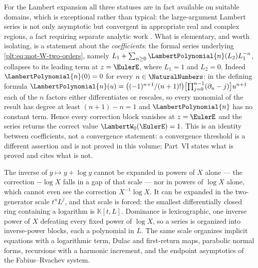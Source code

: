 \documentclass[11pt,oneside]{article}
\theoremstyle{plain}
\theoremstyle{definition}
\theoremstyle{remark}
\newcommand{\K}{\mathbb{K}}
\newcommand{\LamP}[1]{\LambertPolynomial{#1}}
\begin{document}
For the Lambert expansion all three statuses are in fact available on suitable
domains, which is exceptional rather than typical: the large-argument Lambert
series is not only asymptotic but convergent in appropriate real and complex
regions, a fact requiring separate analytic work
\cite{corless-et-al-1996,dlmf-W}.
What is elementary, and worth isolating, is a statement about the
\emph{coefficients}: the formal series underlying
\eqref{plt:eq:mot-W-two-orders}, namely
\(L_{1}+\sum_{n\ge0}\LamP{n}(L_{2})L_{1}^{-n}\), collapses to its leading term
at \(z=\EulerE\), where \(L_{1}=1\) and \(L_{2}=0\).  Indeed
\(\LamP{n}(0)=0\) for every \(n\in\NaturalNumbers\): in the defining formula
\(\LamP{n}(u)=\bigl((-1)^{n+1}/(n+1)!\bigr)
 \bigl[\prod_{j=0}^{n-1}(\partial_{u}-j)\bigr]u^{n+1}\)
each of the \(n\) factors either differentiates or rescales, so every monomial
of the result has degree at least \((n+1)-n=1\) and \(\LamP{n}\) has no
constant term.  Hence every correction block vanishes at \(z=\EulerE\) and the
series returns the correct value \(\LambertW_{0}(\EulerE)=1\).  This is an
identity between coefficients, not a convergence statement: a convergence
threshold is a different assertion and is not proved in this volume; Part~VI
states what is proved and cites what is not.

\begin{summarybox}
The inverse of \(y\mapsto y+\log y\) cannot be expanded in powers of \(X\)
alone --- the correction \(-\log X\) falls in a gap of that scale --- nor in
powers of \(\log X\) alone, which cannot even see the correction
\(X^{-1}\log X\).  It can be expanded in the two-generator scale \(t^{n}L^{j}\),
and that scale is forced: the smallest differentially closed ring containing a
logarithm is \(\K[t,L]\).  Dominance is lexicographic, one inverse power of
\(X\) defeating every fixed power of \(\log X\), so a series is organized into
inverse-power blocks, each a polynomial in \(L\).  The same scale organizes
implicit equations with a logarithmic term, Dulac and first-return maps,
parabolic normal forms, recursions with a harmonic increment, and the endpoint
asymptotics of the Fabius--Rvachev system.
\end{summarybox}
\end{document}
